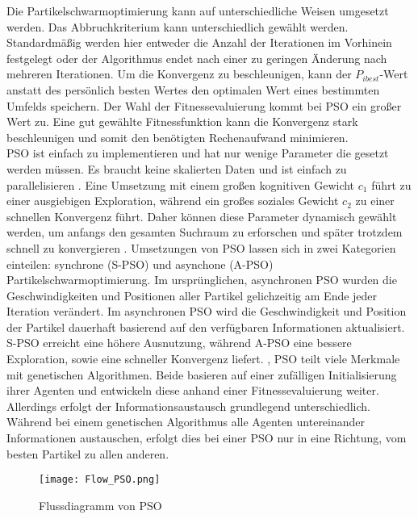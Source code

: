 Die Partikelschwarmoptimierung kann auf unterschiedliche Weisen umgesetzt werden.
Das Abbruchkriterium kann unterschiedlich gewählt werden. Standardmäßig werden hier entweder die Anzahl der Iterationen im Vorhinein festgelegt oder der Algorithmus endet nach einer zu geringen Änderung nach mehreren Iterationen. 
Um die Konvergenz zu beschleunigen, kann der $P_{ibest}$-Wert anstatt des persönlich besten Wertes den optimalen Wert eines bestimmten Umfelds speichern.
Der Wahl der Fitnessevaluierung kommt bei PSO ein großer Wert zu. Eine gut gewählte Fitnessfunktion kann die Konvergenz stark beschleunigen und somit den benötigten Rechenaufwand minimieren.\\
PSO ist einfach zu implementieren und hat nur wenige Parameter die gesetzt werden müssen. Es braucht keine skalierten Daten und ist einfach zu parallelisieren \cite{poli2007particle}.
Eine Umsetzung mit einem großen kognitiven Gewicht $c_1$ führt zu einer ausgiebigen Exploration, während ein großes soziales Gewicht $c_2$ zu einer schnellen Konvergenz führt. Daher können diese Parameter dynamisch gewählt werden, um anfangs den gesamten Suchraum zu erforschen und später trotzdem schnell zu konvergieren \cite{suganthan1999particle}. 
Umsetzungen von PSO lassen sich in zwei Kategorien einteilen: synchrone (S-PSO) und asynchone (A-PSO) Partikelschwarmoptimierung. Im ursprünglichen, asynchronen PSO wurden die Geschwindigkeiten und Positionen aller Partikel gelichzeitig am Ende jeder Iteration verändert. Im asynchronen PSO wird die Geschwindigkeit und Position der Partikel dauerhaft basierend auf den verfügbaren Informationen aktualisiert.  S-PSO erreicht eine höhere Ausnutzung, während A-PSO eine bessere Exploration, sowie eine schneller Konvergenz liefert. \cite{carlisle2001g}, \cite{ab2014synchronous}
PSO teilt viele Merkmale mit genetischen Algorithmen. Beide basieren auf einer zufälligen Initialisierung ihrer Agenten und entwickeln diese anhand einer Fitnessevaluierung weiter. Allerdings erfolgt der Informationsaustausch grundlegend unterschiedlich. Während bei einem genetischen Algorithmus alle Agenten untereinander Informationen austauschen, erfolgt dies bei einer PSO nur in eine Richtung, vom besten Partikel zu allen anderen.\\

\begin{figure}
  \centering
  \texttt{[image: Flow\_PSO.png]}
  \caption{Flussdiagramm von PSO}
  \label{fig:Figure_PSO}
\end{figure}

